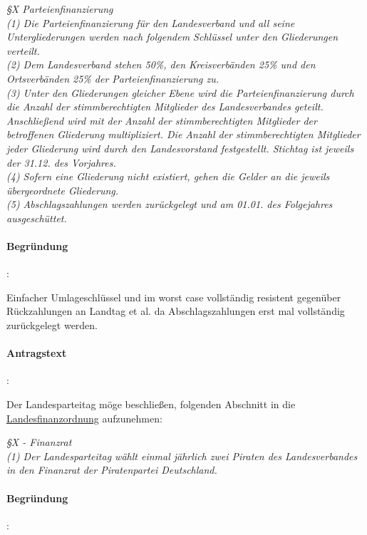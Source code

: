 \textit{§X Parteienfinanzierung\\
(1) Die Parteienfinanzierung für den Landesverband und all seine Untergliederungen werden nach folgendem Schlüssel unter den Gliederungen verteilt.\\ 
(2) Dem Landesverband stehen 50\%, den Kreisverbänden 25\% und den Ortsverbänden 25\% der Parteienfinanzierung zu.\\
(3) Unter den Gliederungen gleicher Ebene wird die Parteienfinanzierung durch die Anzahl der stimmberechtigten Mitglieder des Landesverbandes geteilt. Anschließend wird mit der Anzahl der stimmberechtigten Mitglieder der betroffenen Gliederung multipliziert. Die Anzahl der stimmberechtigten Mitglieder jeder Gliederung wird durch den Landesvorstand festgestellt. Stichtag ist jeweils der 31.12. des Vorjahres.\\
(4) Sofern eine Gliederung nicht existiert, gehen die Gelder an die jeweils übergeordnete Gliederung.\\
(5) Abschlagszahlungen werden zurückgelegt und am 01.01. des Folgejahres ausgeschüttet.}

\paragraph{Begründung}:

Einfacher Umlageschlüssel und im worst case vollständig resistent gegenüber Rückzahlungen an Landtag et al. da Abschlagszahlungen erst mal vollständig zurückgelegt werden.



\paragraph{Antragstext}:

Der Landesparteitag möge beschließen, folgenden Abschnitt in die \href{http://wiki.piratenpartei.de/LSA:Satzung#Abschnitt_B:_Finanzordnung}{Landesfinanzordnung} aufzunehmen:

\textit{§X - Finanzrat\\
(1) Der Landesparteitag wählt einmal jährlich zwei Piraten des Landesverbandes in den Finanzrat der Piratenpartei Deutschland.}

\paragraph{Begründung}:

